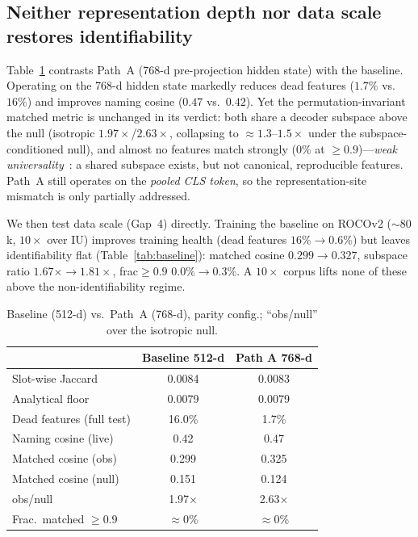 \documentclass[sigconf, nonacm]{acmart}
\begin{document}
\subsection{Neither representation depth nor data scale restores identifiability}
Table~\ref{tab:patha} contrasts Path~A (768-d pre-projection hidden state) with the baseline. Operating on the 768-d hidden state markedly reduces dead features ($1.7\%$ vs.\ $16\%$) and improves naming cosine ($0.47$ vs.\ $0.42$). Yet the permutation-invariant matched metric is unchanged in its verdict: both share a decoder subspace above the null (isotropic $1.97{\times}$/$2.63{\times}$, collapsing to ${\approx}1.3$--$1.5{\times}$ under the subspace-conditioned null), and almost no features match strongly ($0\%$ at ${\geq}0.9$)---\emph{weak universality}~\cite{lan2024universality,leask2025canonical}: a shared subspace exists, but not canonical, reproducible features. Path~A still operates on the \emph{pooled CLS token}, so the representation-site mismatch is only partially addressed.

We then test data scale (Gap~4) directly. Training the baseline on ROCOv2 (${\sim}80$k, $10{\times}$ over IU) improves training health (dead features $16\%{\to}0.6\%$) but leaves identifiability flat (Table~\ref{tab:baseline}): matched cosine $0.299{\to}0.327$, subspace ratio $1.67{\times}{\to}1.81{\times}$, frac${\geq}0.9$ $0.0\%{\to}0.3\%$. A $10{\times}$ corpus lifts none of these above the non-identifiability regime.

\begin{table}[t]
\caption{Baseline (512-d) vs.\ Path~A (768-d), parity config.; ``obs/null'' over the isotropic null.}
\label{tab:patha}
\small
\begin{tabular}{lcc}
\toprule
 & Baseline 512-d & Path A 768-d \\
\midrule
Slot-wise Jaccard & 0.0084 & 0.0083 \\
Analytical floor & 0.0079 & 0.0079 \\
Dead features (full test) & 16.0\% & 1.7\% \\
Naming cosine (live) & 0.42 & 0.47 \\
Matched cosine (obs) & 0.299 & 0.325 \\
Matched cosine (null) & 0.151 & 0.124 \\
obs/null & 1.97$\times$ & 2.63$\times$ \\
Frac.\ matched $\geq0.9$ & $\approx$0\% & $\approx$0\% \\
\bottomrule
\end{tabular}
\end{table}
\end{document}

